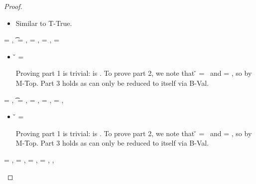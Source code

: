 \begin{lemma}
\begin{enumerate}
\begin{proof}
\begin{case}[T-True]
\begin{case}[T-Kw]
  \begin{itemize}
    \item[]
      \begin{subcase}[B-Val]
        Similar to T-True.
      \end{subcase}
  \end{itemize}
\end{case}

\end{case}

\begin{case}[T-False]
\e{} = \false, \t{} = \False, \thenprop{\prop{}} = \botprop{}, \elseprop{\prop{}} = \topprop{}, \object{} = \emptyobject{}

\begin{itemize}
  \item[] 
    \begin{subcase}[B-Val]
      \v{} = \false{}

Proving part 1 is trivial: \object{} is \emptyobject. To prove part 2, we note that \v{} = \false\ 
and \elseprop{\prop{}} = \topprop{}, so \satisfies{\openv{}}{\elseprop{\prop{}}} by M-Top. 
Part 3 holds as \e{} can only be reduced to itself via B-Val.
\end{subcase}

\end{itemize}
\end{case}

\begin{case}[T-Nil]
\e{} = \nil, \t{} = \Nil, \thenprop{\prop{}} = \botprop{}, \elseprop{\prop{}} = \topprop{}, \object{} = \emptyobject{},

\begin{itemize}
  \item[] 
    \begin{subcase}[B-Val] 
      \v{} = \nil{}

Proving part 1 is trivial: \object{} is \emptyobject. To prove part 2, we note that \v{} = \nil\ 
and \elseprop{\prop{}} = \topprop{}, so \satisfies{\openv{}}{\elseprop{\prop{}}} by M-Top. 
Part 3 holds as \e{} can only be reduced to itself via B-Val.
\end{subcase}

\end{itemize}

\end{case}

\begin{case}[T-Local]
  \e{} = \x{}, \thenprop{\prop{}} = {\notprop {\falsy{}} {\x{}}},
  \elseprop{\prop{}} = {\isprop {\falsy{}} {\x{}}},
\object{} = \x{}, 
\inpropenv{\propenv{}}{\isprop{\t{}}{\x{}}},


\end{case}
\end{proof}
\end{enumerate}
\end{lemma}

